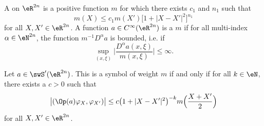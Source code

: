 A  on $\eR^{2n}$ is a positive function $m$ for which there exists $c_1$ and $n_1$ such that
\[
	m(X)\leq c_1m(X')\big[ 1+| X-X' |^2 \big]^{n_1}
\]
for all $X,X'\in\eR^{2n}$. A function $a\in C^{\infty}(\eR^{2n})$ is a  $m$ if  for all multi-index $\alpha\in\eN^{2n}$, the function $m^{-1}D^{\alpha}a$ is bounded, i.e. if
\[
	\sup_{(x,\xi)}\Big|  \frac{ D^{\alpha}a(x,\xi) }{ m(x,\xi) } \Big|\leq\infty.
\]


\begin{theorem}
	Let $a\in\swS'(\eR^{2n})$. This is a symbol of weight $m$ if and only if for all $k\in\eN$, there exists a $c>0$ such that
	\[
		\big|  (\Op(a)\varphi_X,\varphi_{X'})  \big|\leq c\big( 1+| X-X' |^2 \big)^{-k}m\Big( \frac{ X+X' }{2} \Big)
	\]
	for all $X,X'\in\eR^{2n}$.
\end{theorem}
